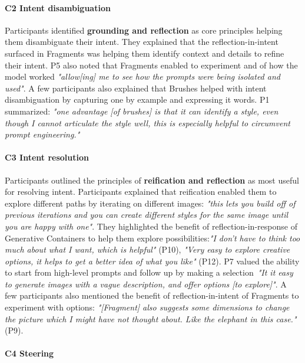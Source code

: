\paragraph{\textbf{C2 Intent disambiguation}}

Participants identified \textbf{grounding and reflection} as core principles helping them disambiguate their intent.  They explained that the reflection-in-intent surfaced in Fragments was helping them identify context and details to refine their intent. P5 also noted that Fragments enabled to experiment and  of how the model worked \textit{"allow[ing] me to see how the prompts were being isolated and used"}. A few participants also explained that Brushes helped with intent disambiguation by capturing one by example and expressing it words. P1 summarized: \textit{"one advantage [of brushes] is that it can identify a style, even though I cannot articulate the style well, this is especially helpful to circumvent prompt engineering."} 



\paragraph{\textbf{C3 Intent resolution}}

Participants outlined the principles of \textbf{reification and reflection} as most useful for resolving intent. Participants explained that reification enabled them to explore different paths by iterating on different images: \textit{"this lets you build off of previous iterations and you can create different styles for the same image until you are happy with one"}. They highlighted the benefit of reflection-in-response of Generative Containers to help them explore possibilities:\textit{"I don't have to think too much about what I want, which is helpful"} (P10), \textit{"Very easy to explore creative options, it helps to get a better idea of what you like"} (P12). P7 valued the ability to start from high-level prompts and follow up by making a selection~\textit{"It it easy to generate images with a vague description, and offer options [to explore]"}. A few participants also mentioned the benefit of reflection-in-intent of Fragments to experiment with options: \textit{"[Fragment] also suggests some dimensions to change the picture which I might have not thought about. Like the elephant in this case."} (P9). 

\paragraph{\textbf{C4 Steering}}

